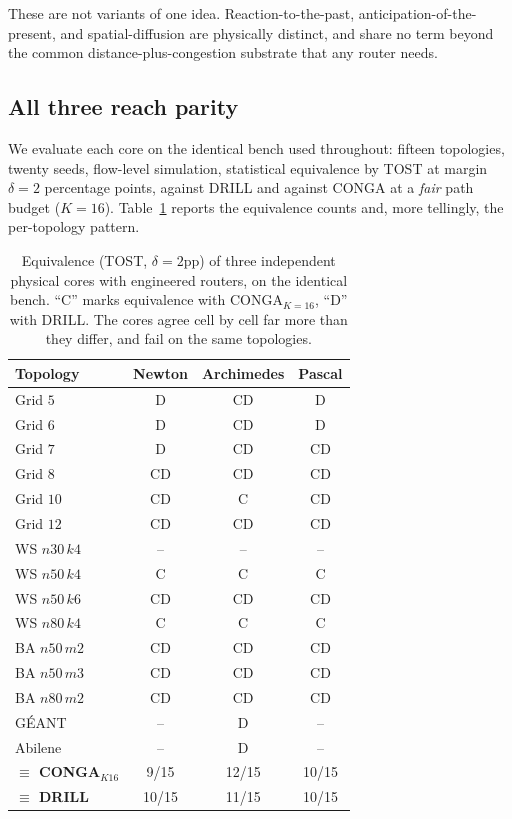 These are not variants of one idea. Reaction-to-the-past, anticipation-of-the-
present, and spatial-diffusion are physically distinct, and share no term beyond
the common distance-plus-congestion substrate that any router needs.

\subsection{All three reach parity}

We evaluate each core on the identical bench used throughout: fifteen
topologies, twenty seeds, flow-level simulation, statistical equivalence by TOST
at margin $\delta = 2$ percentage points, against DRILL and against CONGA at a
\emph{fair} path budget ($K=16$). Table~\ref{tab:convergence} reports the
equivalence counts and, more tellingly, the per-topology pattern.

\begin{table}[t]
\centering
\caption{Equivalence (TOST, $\delta=2$pp) of three independent physical cores
with engineered routers, on the identical bench. ``C'' marks equivalence with
CONGA$_{K=16}$, ``D'' with DRILL. The cores agree cell by cell far more than
they differ, and fail on the same topologies.}
\label{tab:convergence}
\small
\begin{tabular}{lccc}
\toprule
Topology & Newton & Archimedes & Pascal \\
\midrule
Grid $5$     & \phantom{C}D & CD           & \phantom{C}D \\
Grid $6$     & \phantom{C}D & CD           & \phantom{C}D \\
Grid $7$     & \phantom{C}D & CD           & CD \\
Grid $8$     & CD           & CD           & CD \\
Grid $10$    & CD           & C\phantom{D} & CD \\
Grid $12$    & CD           & CD           & CD \\
WS $n30\,k4$ & --           & --           & -- \\
WS $n50\,k4$ & C\phantom{D} & C\phantom{D} & C\phantom{D} \\
WS $n50\,k6$ & CD           & CD           & CD \\
WS $n80\,k4$ & C\phantom{D} & C\phantom{D} & C\phantom{D} \\
BA $n50\,m2$ & CD           & CD           & CD \\
BA $n50\,m3$ & CD           & CD           & CD \\
BA $n80\,m2$ & CD           & CD           & CD \\
G\'EANT      & --           & \phantom{C}D & -- \\
Abilene      & --           & \phantom{C}D & -- \\
\midrule
\textbf{$\equiv$ CONGA$_{K16}$} & 9/15 & 12/15 & 10/15 \\
\textbf{$\equiv$ DRILL}         & 10/15 & 11/15 & 10/15 \\
\bottomrule
\end{tabular}
\end{table}

